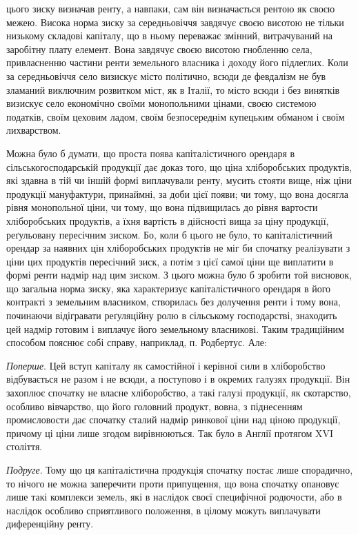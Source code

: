 \parcont{}  %
цього зиску визначав ренту, а навпаки, сам він визначається рентою як своєю
межею. Висока норма зиску за середньовіччя завдячує своєю висотою не тільки
низькому складові капіталу, що в ньому переважає змінний, витрачуваний на
заробітну плату елемент. Вона завдячує своєю висотою гнобленню села, привласненню
частини ренти земельного власника і доходу його підлеглих. Коли за
середньовіччя село визискує місто політично, всюди де февдалізм не був зламаний
виключним розвитком міст, як в Італії, то місто всюди і без винятків
визискує село економічно своїми монопольними цінами, своєю системою податків,
своїм цеховим ладом, своїм безпосереднім купецьким обманом і своїм
лихварством.

Можна було б думати, що проста поява капіталістичного орендаря в сільсько\dash{}господарській
продукції дає доказ того, що ціна хліборобських продуктів,
які здавна в тій чи іншій формі виплачували ренту, мусить стояти вище, ніж
ціни продукції мануфактури, принаймні, за доби цієї появи; чи тому, що
вона досягла рівня монопольної ціни, чи тому, що вона підвищилась до
рівня вартости хліборобських продуктів, а їхня вартість в дійсності вища за
ціну продукції, реґульовану пересічним зиском. Бо, коли б цього не було, то
капіталістичний орендар за наявних цін хліборобських продуктів не міг би
спочатку реалізувати з ціни цих продуктів пересічний зиск, а потім з цієї
самої ціни ще виплатити в формі ренти надмір над цим зиском. З цього можна
було б зробити той висновок, що загальна норма зиску, яка характеризує капіталістичного
орендаря в його контракті з земельним власником, створилась без
долучення ренти і тому вона, починаючи відігравати реґуляційну ролю в сільському
господарстві, знаходить цей надмір готовим і виплачує його земельному
власникові. Таким традиційним способом пояснює собі справу, наприклад,
п. Родбертус. Але:

\emph{Поперше}. Цей вступ капіталу як самостійної і керівної сили в хліборобство
відбувається не разом і не всюди, а поступово і в окремих галузях продукції.
Він захоплює спочатку не власне хліборобство, а такі галузі продукції,
як скотарство, особливо вівчарство, що його головний продукт, вовна, з піднесенням
промисловости дає спочатку сталий надмір ринкової ціни над ціною
продукції, причому ці ціни лише згодом вирівнюються. Так було в Англії протягом
XVI століття.

\emph{Подруге}. Тому що ця капіталістична продукція спочатку постає лише
спорадично, то нічого не можна заперечити проти припущення, що вона спочатку
опановує лише такі комплекси земель, які в наслідок своєї специфічної
родючости, або в наслідок особливо сприятливого положення, в цілому можуть
виплачувати диференційну ренту.

